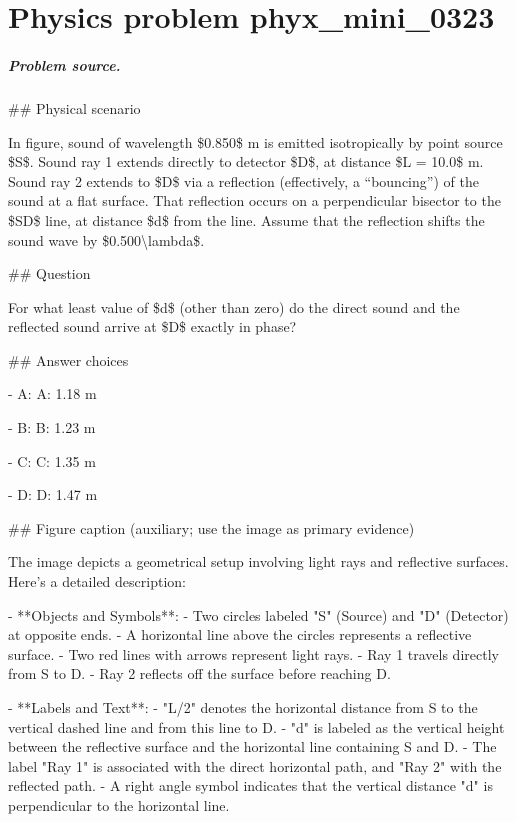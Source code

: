 
\chapter{Physics problem phyx\_mini\_0323}
\label{ch:PhyXMiniProblems_problem_phyx_mini_0323}

\paragraph{Problem source.}
\#\# Physical scenario

In figure, sound of wavelength \$0.850\$ m is emitted isotropically by point source \$S\$. Sound ray 1 extends directly to detector \$D\$, at distance \$L = 10.0\$ m. Sound ray 2 extends to \$D\$ via a reflection (effectively, a ``bouncing'') of the sound at a flat surface. That reflection occurs on a perpendicular bisector to the \$SD\$ line, at distance \$d\$ from the line. Assume that the reflection shifts the sound wave by \$0.500\textbackslash{}lambda\$.

\#\# Question

For what least value of \$d\$ (other than zero) do the direct sound and the reflected sound arrive at \$D\$ exactly in phase?

\#\# Answer choices

- A: A: 1.18 m

- B: B: 1.23 m

- C: C: 1.35 m

- D: D: 1.47 m

\#\# Figure caption (auxiliary; use the image as primary evidence)

The image depicts a geometrical setup involving light rays and reflective surfaces. Here's a detailed description:

- **Objects and Symbols**:
  - Two circles labeled "S" (Source) and "D" (Detector) at opposite ends.
  - A horizontal line above the circles represents a reflective surface.
  - Two red lines with arrows represent light rays. 
    - Ray 1 travels directly from S to D.
    - Ray 2 reflects off the surface before reaching D.

- **Labels and Text**:
  - "L/2" denotes the horizontal distance from S to the vertical dashed line and from this line to D.
  - "d" is labeled as the vertical height between the reflective surface and the horizontal line containing S and D.
  - The label "Ray 1" is associated with the direct horizontal path, and "Ray 2" with the reflected path.
  - A right angle symbol indicates that the vertical distance "d" is perpendicular to the horizontal line.

